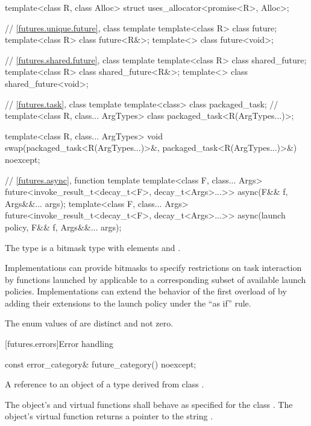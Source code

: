 \begin{codeblock}
{  template<class R, class Alloc>
    struct uses_allocator<promise<R>, Alloc>;

  // \ref{futures.unique.future}, class template 
  template<class R> class future;
  template<class R> class future<R&>;
  template<> class future<void>;

  // \ref{futures.shared.future}, class template 
  template<class R> class shared_future;
  template<class R> class shared_future<R&>;
  template<> class shared_future<void>;

  // \ref{futures.task}, class template 
  template<class> class packaged_task;  // \notdef
  template<class R, class... ArgTypes>
    class packaged_task<R(ArgTypes...)>;

  template<class R, class... ArgTypes>
    void swap(packaged_task<R(ArgTypes...)>&, packaged_task<R(ArgTypes...)>&) noexcept;

  // \ref{futures.async}, function template 
  template<class F, class... Args>
    future<invoke_result_t<decay_t<F>, decay_t<Args>...>>
      async(F&& f, Args&&... args);
  template<class F, class... Args>
    future<invoke_result_t<decay_t<F>, decay_t<Args>...>>
      async(launch policy, F&& f, Args&&... args);
}
\end{codeblock}

\pnum
The  type  is a bitmask type with
elements  and .
\begin{note}
Implementations can provide bitmasks to specify restrictions on task
interaction by functions launched by  applicable to a
corresponding subset of available launch policies. Implementations can extend
the behavior of the first overload of  by adding their extensions
to the launch policy under the ``as if'' rule.
\end{note}

\pnum
The enum values of  are distinct and not zero.

[futures.errors]{Error handling}

%
\begin{itemdecl}
const error_category& future_category() noexcept;
\end{itemdecl}

\begin{itemdescr}
\pnum
\returns
A reference to an object of a type derived from class .

\pnum
The object's  and  virtual functions shall
behave as specified for the class . The object's 
virtual function returns a pointer to the string .
\end{itemdescr}


